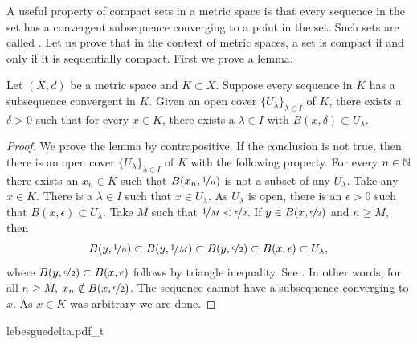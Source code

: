 A useful property of compact sets in a metric space is that every
sequence in the set has a convergent subsequence converging
to a point in the set.
Such sets are called
\emph{}.
Let us prove that in the
context of metric spaces, a set is compact if and only if it is sequentially
compact.
First we prove a lemma.

\begin{lemma}\label{ms:lebesgue}
Let $(X,d)$ be a metric space and $K \subset X$.  Suppose 
every sequence in $K$ has a subsequence convergent in $K$.  Given
an open cover $\{ U_\lambda \}_{\lambda \in I}$ of $K$, there exists a
$\delta > 0$ such that for every $x \in K$, there exists a $\lambda \in I$
with $B(x,\delta) \subset U_\lambda$.
\end{lemma}

\begin{proof}
We prove the lemma by contrapositive.
If the conclusion is not true, then
there is
an open cover $\{ U_\lambda \}_{\lambda \in I}$ of $K$ with
the following property.
For every $n \in {\mathbb{N}}$ there exists an $x_n \in K$ such that
$B(x_n,\nicefrac{1}{n})$ is not a subset of any $U_\lambda$.
Take any $x \in K$.  There is
a $\lambda \in I$ such that $x \in U_\lambda$.  As $U_\lambda$ is open,
there is an $\epsilon > 0$ 
such that $B(x,\epsilon) \subset U_\lambda$.  Take $M$ such that
$\nicefrac{1}{M} < \nicefrac{\epsilon}{2}$.  If $y \in 
B(x,\nicefrac{\epsilon}{2})$ and $n \geq M$, then 
\begin{equation*}
B(y,\nicefrac{1}{n}) \subset
B(y,\nicefrac{1}{M}) \subset
B(y,\nicefrac{\epsilon}{2}) \subset B(x,\epsilon)
\subset U_\lambda ,
\end{equation*}
where 
$B(y,\nicefrac{\epsilon}{2}) \subset B(x,\epsilon)$
follows by triangle inequality.
See .
In other words, for all $n \geq M$, $x_n \notin B(x,\nicefrac{\epsilon}{2})$. 
The sequence cannot have a subsequence converging to $x$.  As $x \in K$ was
arbitrary we are done.
\end{proof}

\begin{myfigureht}
{lebesguedelta.pdf_t}
\caption{Proof of Lebesgue covering lemma.
Note that $B(y,\nicefrac{\epsilon}{2}) \subset
B(x,\epsilon)$ by triangle inequality.\label{fig:lebesguedelta}}
\end{myfigureht}

